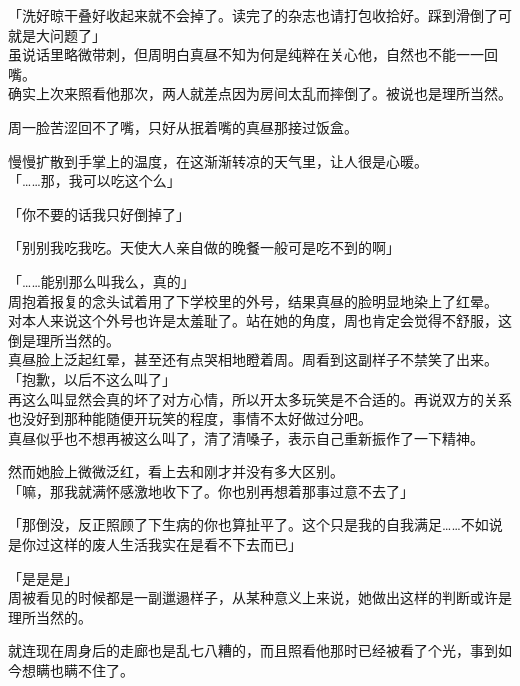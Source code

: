 「洗好晾干叠好收起来就不会掉了。读完了的杂志也请打包收拾好。踩到滑倒了可就是大问题了」\\

虽说话里略微带刺，但周明白真昼不知为何是纯粹在关心他，自然也不能一一回嘴。\\

确实上次来照看他那次，两人就差点因为房间太乱而摔倒了。被说也是理所当然。

周一脸苦涩回不了嘴，只好从抿着嘴的真昼那接过饭盒。

慢慢扩散到手掌上的温度，在这渐渐转凉的天气里，让人很是心暖。\\

「……那，我可以吃这个么」

「你不要的话我只好倒掉了」

「别别我吃我吃。天使大人亲自做的晚餐一般可是吃不到的啊」

「……能别那么叫我么，真的」\\

周抱着报复的念头试着用了下学校里的外号，结果真昼的脸明显地染上了红晕。\\

对本人来说这个外号也许是太羞耻了。站在她的角度，周也肯定会觉得不舒服，这倒是理所当然的。\\

真昼脸上泛起红晕，甚至还有点哭相地瞪着周。周看到这副样子不禁笑了出来。\\

「抱歉，以后不这么叫了」\\

再这么叫显然会真的坏了对方心情，所以开太多玩笑是不合适的。再说双方的关系也没好到那种能随便开玩笑的程度，事情不太好做过分吧。\\

真昼似乎也不想再被这么叫了，清了清嗓子，表示自己重新振作了一下精神。

然而她脸上微微泛红，看上去和刚才并没有多大区别。\\

「嘛，那我就满怀感激地收下了。你也别再想着那事过意不去了」

「那倒没，反正照顾了下生病的你也算扯平了。这个只是我的自我满足……不如说是你过这样的废人生活我实在是看不下去而已」

「是是是」\\

周被看见的时候都是一副邋遢样子，从某种意义上来说，她做出这样的判断或许是理所当然的。

就连现在周身后的走廊也是乱七八糟的，而且照看他那时已经被看了个光，事到如今想瞒也瞒不住了。\\

